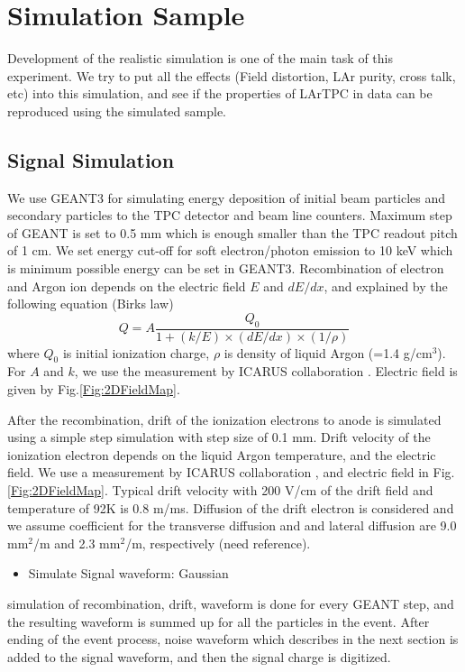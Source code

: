 \section{Simulation Sample}
Development of the realistic simulation is one of the main task of this experiment.
We try to put all the effects (Field distortion, LAr purity, cross talk, etc) into this simulation,
and see if the properties of LArTPC in data can be reproduced using the simulated sample.

\label{Sec:Simulation}
\subsection{Signal Simulation}
We use GEANT3 for simulating energy deposition of initial beam particles and
secondary particles to the TPC detector and beam line counters. 
Maximum step of GEANT is set to 0.5 mm which is enough smaller than the TPC readout pitch of 1 cm.
We set energy cut-off for soft electron/photon emission to 10 keV which is minimum possible energy can be set in GEANT3.
Recombination of electron and Argon ion depends on the electric field $E$ and $dE/dx$, and explained by the following equation (Birks law)
\begin{equation}
  Q = A\frac{Q_{0}}{1+(k/E)\times(dE/dx)\times(1/\rho)}
\label{eq:birkslaw}
\end{equation}
where $Q_{0}$ is initial ionization charge, $\rho$ is density of liquid Argon (=1.4 g/cm$^3$).
For $A$ and $k$, we use the measurement by ICARUS collaboration \cite{658352}.
Electric field is given by Fig.\ref{Fig:2DFieldMap}.

After the recombination, drift of the ionization electrons to anode is simulated
using a simple step simulation with step size of 0.1 mm.
Drift velocity of the ionization electron depends on the liquid Argon temperature,
and the electric field. We use a measurement by ICARUS collaboration \cite{649233}, and
electric field in Fig.\ref{Fig:2DFieldMap}. 
Typical drift velocity with 200 V/cm of the drift field and temperature of 92K is 0.8 m/ms.
Diffusion of the drift electron is considered and we assume coefficient for the transverse diffusion 
and and lateral diffusion are 9.0 mm$^2$/m and 2.3 mm$^2$/m, respectively (need reference).

\begin{itemize}
\item Simulate Signal waveform: Gaussian
\end{itemize}
simulation of recombination, drift, waveform is done for every GEANT step, and
the resulting waveform is summed up for all the particles in the event.
After ending of the event process, noise waveform which describes in the next section is added to the signal waveform,
and then the signal charge is digitized.

